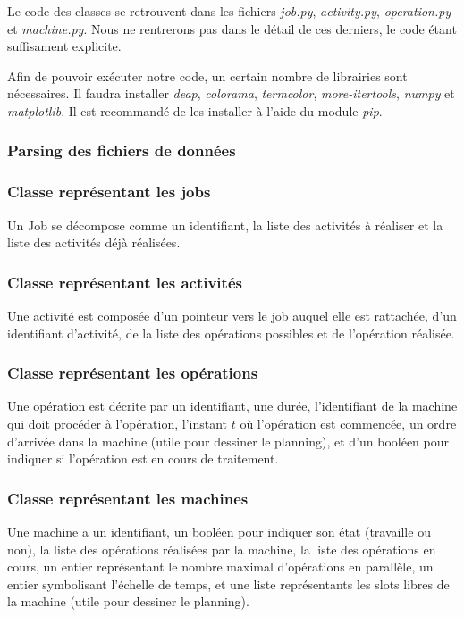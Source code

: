 Le code des classes se retrouvent dans les fichiers \textit{job.py}, \textit{activity.py}, \textit{operation.py} et \textit{machine.py}. Nous ne rentrerons pas dans le détail de ces derniers, le code étant suffisament explicite.

Afin de pouvoir exécuter notre code, un certain nombre de librairies sont nécessaires. Il faudra installer \textit{deap}, \textit{colorama}, \textit{termcolor}, \textit{more-itertools}, \textit{numpy} et \textit{matplotlib}. Il est recommandé de les installer à l'aide du module \textit{pip}.

\newpage

\subsubsection{Parsing des fichiers de données}



\subsubsection{Classe représentant les jobs}

Un Job se décompose comme un identifiant, la liste des activités à réaliser et la liste des activités déjà réalisées.

\subsubsection{Classe représentant les activités}

Une activité est composée d'un pointeur vers le job auquel elle est rattachée, d'un identifiant d'activité, de la liste des opérations possibles et de l'opération réalisée.

\subsubsection{Classe représentant les opérations}

Une opération est décrite par un identifiant, une durée, l'identifiant de la machine qui doit procéder à l'opération, l'instant $t$ où l'opération est commencée, un ordre d'arrivée dans la machine (utile pour dessiner le planning), et d'un booléen pour indiquer si l'opération est en cours de traitement.

\subsubsection{Classe représentant les machines}

Une machine a un identifiant, un booléen pour indiquer son état (travaille ou non), la liste des opérations réalisées par la machine, la liste des opérations en cours, un entier représentant le nombre maximal d'opérations en parallèle, un entier symbolisant l'échelle de temps, et une liste représentants les slots libres de la machine (utile pour dessiner le planning).